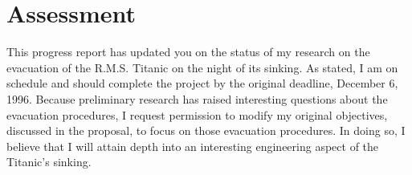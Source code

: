 \documentclass[12pt]{article}
\begin{document}
\section{Assessment}
This progress report has updated you on the status of my research on the evacuation of the R.M.S. Titanic on the night of its sinking. As stated, I am on schedule and should complete the project by the original deadline, December 6, 1996. Because preliminary research has raised interesting questions about the evacuation procedures, I request permission to modify my original objectives, discussed in the proposal, to focus on those evacuation procedures. In doing so, I believe that I will attain depth into an interesting engineering aspect of the Titanic's sinking.



\end{document}
